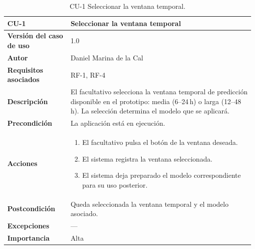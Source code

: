 \documentclass[
  spanish,
  a4paper,
  12pt,
  twoside]{memoir}
\providecommand{\tightlist}{%
  \setlength{\itemsep}{0pt}\setlength{\parskip}{0pt}}
\begin{document}
\begin{table}[p]
    \centering
    \begin{tabularx}{\linewidth}{ p{} p{} }
        \toprule
        \textbf{CU-1} & \textbf{Seleccionar la ventana temporal}\\
        \toprule
        \textbf{Versión del caso de uso} & 1.0 \\
        \textbf{Autor} & Daniel Marina de la Cal \\
        \textbf{Requisitos asociados} & RF-1, RF-4 \\
        \textbf{Descripción} & El facultativo selecciona la ventana temporal de predicción disponible en el prototipo: media (6--24\,h) o larga (12--48\,h). La selección determina el modelo que se aplicará. \\
        \textbf{Precondición} & La aplicación está en ejecución. \\
        \textbf{Acciones} &
        \begin{enumerate}
            \def\labelenumi{\arabic{enumi}.}
            \tightlist
            \item El facultativo pulsa el botón de la ventana deseada.
            \item El sistema registra la ventana seleccionada.
            \item El sistema deja preparado el modelo correspondiente para su uso posterior.
        \end{enumerate}\\
        \textbf{Postcondición} & Queda seleccionada la ventana temporal y el modelo asociado. \\
        \textbf{Excepciones} & --- \\
        \textbf{Importancia} & Alta \\
        \bottomrule
    \end{tabularx}
    \caption{CU-1 Seleccionar la ventana temporal.}
\end{table}
\end{document}
